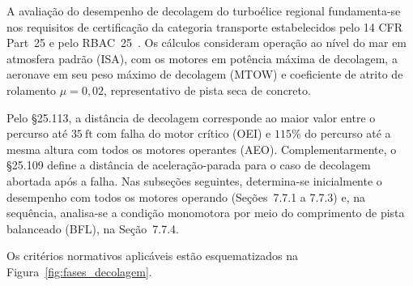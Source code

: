 A avaliação do desempenho de decolagem do turboélice regional fundamenta-se nos requisitos de certificação da categoria transporte estabelecidos pelo 14 CFR Part~25 e pelo RBAC~25~\cite{far25}. Os cálculos consideram operação ao nível do mar em atmosfera padrão (ISA), com os motores em potência máxima de decolagem, a aeronave em seu peso máximo de decolagem (MTOW) e coeficiente de atrito de rolamento $\mu = 0{,}02$, representativo de pista seca de concreto.

Pelo \S25.113, a distância de decolagem corresponde ao maior valor entre o percurso até $35~\text{ft}$ com falha do motor crítico (OEI) e $115\%$ do percurso até a mesma altura com todos os motores operantes (AEO). Complementarmente, o \S25.109 define a distância de aceleração-parada para o caso de decolagem abortada após a falha. Nas subseções seguintes, determina-se inicialmente o desempenho com todos os motores operando (Seções~7.7.1 a 7.7.3) e, na sequência, analisa-se a condição monomotora por meio do comprimento de pista balanceado (BFL), na Seção~7.7.4.

Os critérios normativos aplicáveis estão esquematizados na Figura~\ref{fig:fases_decolagem}.

